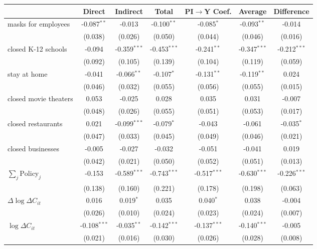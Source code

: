 
\begin{tabular}{lccccc|>{}c}
\toprule
  & Direct & Indirect & Total & PI$\to$Y Coef. & Average & Difference\\
\midrule
masks for employees & -0.087$^{**}$ & -0.013 & -0.100$^{**}$ & -0.085$^{*}$ & -0.093$^{**}$ & -0.014\\
 & (0.038) & (0.026) & (0.050) & (0.044) & (0.046) & (0.016)\\
closed K-12 schools & -0.094 & -0.359$^{***}$ & -0.453$^{***}$ & -0.241$^{**}$ & -0.347$^{***}$ & -0.212$^{***}$\\
 & (0.092) & (0.105) & (0.139) & (0.104) & (0.119) & (0.059)\\
stay at home & -0.041 & -0.066$^{**}$ & -0.107$^{*}$ & -0.131$^{**}$ & -0.119$^{**}$ & 0.024\\
 & (0.046) & (0.032) & (0.055) & (0.056) & (0.055) & (0.015)\\
closed movie theaters & 0.053 & -0.025 & 0.028 & 0.035 & 0.031 & -0.007\\
 & (0.048) & (0.026) & (0.055) & (0.051) & (0.053) & (0.017)\\
closed restaurants & 0.021 & -0.099$^{***}$ & -0.079$^{*}$ & -0.043 & -0.061 & -0.035$^{*}$\\
 & (0.047) & (0.033) & (0.045) & (0.049) & (0.046) & (0.021)\\
closed businesses & -0.005 & -0.027 & -0.032 & -0.051 & -0.041 & 0.019\\
 & (0.042) & (0.021) & (0.050) & (0.052) & (0.051) & (0.013)\\
$\sum_j \mathrm{Policy}_j$ & -0.153 & -0.589$^{***}$ & -0.743$^{***}$ & -0.517$^{***}$ & -0.630$^{***}$ & -0.226$^{***}$\\
 & (0.138) & (0.160) & (0.221) & (0.178) & (0.198) & (0.063)\\
$\Delta \log \Delta C_{it}$ & 0.016 & 0.019$^{*}$ & 0.035 & 0.040$^{*}$ & 0.038 & -0.004\\
 & (0.026) & (0.010) & (0.024) & (0.023) & (0.024) & (0.007)\\
$\log \Delta C_{it}$ & -0.108$^{***}$ & -0.035$^{**}$ & -0.142$^{***}$ & -0.137$^{***}$ & -0.140$^{***}$ & -0.005\\
 & (0.021) & (0.016) & (0.030) & (0.026) & (0.028) & (0.008)\\
\bottomrule
\end{tabular}